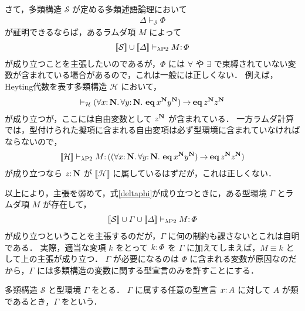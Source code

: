 \documentclass[./main]{subfiles}
\begin{document}
さて，多類構造 $ \mathscr{S} $ が定める多類述語論理において
\begin{gather}
\varDelta \vdash _{\mathscr{S}} \varPhi \label{deltaphi}
\end{gather}
が証明できるならば，あるラムダ項 $ M $ によって
\begin{gather*}
[\![ \mathcal{S} ]\!] \cup [\![ \varDelta ]\!] \vdash _{\lambda \mathrm{P2}} M \mathord{:}\, \varPhi
\end{gather*}
が成り立つことを主張したいのであるが，$ \varPhi $ には $ \forall $ や $ \exists $ で束縛されていない変数が含まれている場合があるので，これは一般には正しくない．
例えば，Heyting代数を表す多類構造 $ \mathscr{H} $ において，
\begin{gather*}
\vdash _{\mathcal{H}} (\forall x \mathord{:}\, \mathbf{N}.\, \forall y \mathord{:}\, \mathbf{N}.\, \mathop{\mathbf{eq}}\nolimits x ^{\mathbf{N}} y ^{\mathbf{N}}) \mathbin{\to} \mathop{\mathbf{eq}}\nolimits z ^{\mathbf{N}} z ^{\mathbf{N}}
\end{gather*}
が成り立つが，ここには自由変数として $ z ^{\mathbf{N}} $ が含まれている．
一方ラムダ計算では，型付けられた擬項に含まれる自由変項は必ず型環境に含まれていなければならないので，
\begin{gather*}
[\![ \mathcal{H} ]\!] \vdash _{\lambda \mathrm{P2}} M \mathord{:}\, ((\forall x \mathord{:}\, \mathbf{N}.\, \forall y \mathord{:}\, \mathbf{N}.\, \mathop{\mathbf{eq}}\nolimits x ^{\mathbf{N}} y ^{\mathbf{N}}) \mathbin{\to} \mathop{\mathbf{eq}}\nolimits z ^{\mathbf{N}} z ^{\mathbf{N}})
\end{gather*}
が成り立つなら $ z \mathord{:}\, \mathbf{N} $ が $ \llbracket \mathscr{H} \rrbracket $ に属しているはずだが，これは正しくない．

以上により，主張を弱めて，式\ref{deltaphi}が成り立つときに，ある型環境 $ \varGamma $ とラムダ項 $ M $ が存在して，
\begin{gather}
\llbracket \mathscr{S} \rrbracket \cup \varGamma \cup \llbracket \varDelta \rrbracket \vdash _{\lam \mathrm{P2}} M \ocl\, \varPhi \label{gammaphi}
\end{gather}
が成り立つということを主張するのだが，$ \varGamma $ に何の制約も課さないとこれは自明である．
実際，適当な変項 $ k $ をとって $ k \mathord{:}\, \varPhi $ を $ \varGamma $ に加えてしまえば，$ M \equiv k $ として上の主張が成り立つ．
$ \varGamma $ が必要になるのは $ \varPhi $ に含まれる変数が原因なのだから，$ \varGamma $ には多類構造の変数に関する型宣言のみを許すことにする．

\begin{ziphildefi}
多類構造 $ \mathscr{S} $ と型環境 $ \varGamma $ をとる．
$ \varGamma $ に属する任意の型宣言 $ x \mathord{:}\, A $ に対して $ A $ が類であるとき，$ \varGamma $ をという．
\end{ziphildefi}
\end{document}
